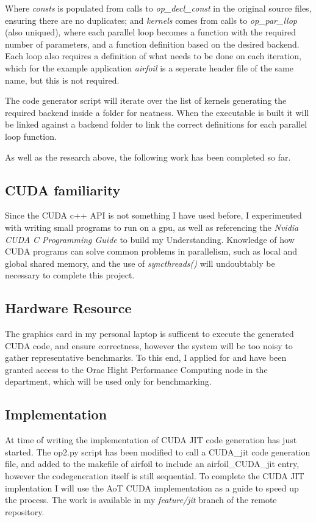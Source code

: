 \documentclass[11pt]{article}
\begin{document}
Where \textit{consts} is populated from calls to \textit{op\_decl\_const} in the original source files, ensuring there are no duplicates; and \textit{kernels} comes from calls to \textit{op\_par\_llop} (also uniqued), where each parallel loop becomes a function with the required number of parameters, and a function definition based on the desired backend. Each loop also requires a definition of what needs to be done on each iteration, which for the example application \textit{airfoil} is a seperate header file of the same name, but this is not required.
\par The code generator script will iterate over the list of kernels generating the required backend inside a folder for neatness. When the executable is built it will be linked against a backend folder to link the correct definitions for each parallel loop function.

As well as the research above, the following work has been completed so far.
\subsection*{CUDA familiarity}
Since the CUDA c++ API is not something I have used before, I experimented with writing small programs to run on a gpu, as well as referencing the \textit{Nvidia CUDA C Programming Guide} to build my Understanding. Knowledge of how CUDA programs can solve common problems in parallelism, such as local and global shared memory, and the use of \textit{syncthreads()} will undoubtably be necessary to complete this project.

\subsection*{Hardware Resource}
The graphics card in my personal laptop is sufficent to execute the generated CUDA code, and ensure correctness, however the system will be too noisy to gather representative benchmarks. To this end, I applied for and have been granted access to the Orac Hight Performance Computing node in the department, which will be used only for benchmarking.

\subsection*{Implementation}
At time of writing the implementation of CUDA JIT code generation has just started. The op2.py script has been modified to call a CUDA\_jit code generation file, and added to the makefile of airfoil to include an airfoil\_CUDA\_jit entry, however the codegeneration itself is still sequential. To complete the CUDA JIT implentation I will use the AoT CUDA implementation as a guide to speed up the process. The work is available in my \textit{feature/jit} branch of the remote repository.
\end{document}
